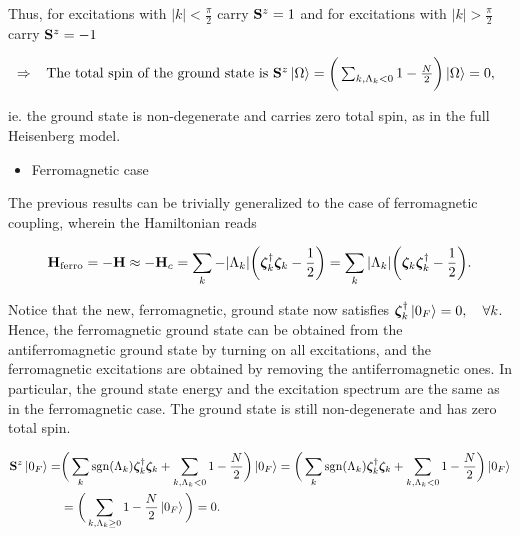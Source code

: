 \documentclass{homework}
\begin{document}
Thus, for excitations with $|k| < \frac{\pi}{2}$ carry ${\bf S}^z = 1$ and for excitations with $|k| > \frac{\pi}{2}$ carry ${\bf S}^z = -1$ 

\begin{equation}
    \begin{split}
        \Rightarrow \begin{array}{cc}
             \textnormal{ The total spin of the ground state is } {\bf S}^z \ket{\Omega} = \bigg(\sum_{k, \Lambda_k < 0} 1-\frac{N}{2}\bigg) \ket{\Omega} = 0,
        \end{array} 
    \end{split}
\end{equation}

ie. the ground state is non-degenerate and carries zero total spin, as in the full Heisenberg model. \\

\begin{itemize}
    \item Ferromagnetic case
\end{itemize}

The previous results can be trivially generalized to the case of ferromagnetic coupling, wherein the Hamiltonian reads 

\begin{equation}
    {\bf H}_{\textnormal{ferro}} = - {\bf H} \approx -{\bf H}_c = \sum_{k} -|\Lambda_k| \bigg( \bm{\zeta}_k^\dagger \bm{\zeta}_k - \frac{1}{2} \bigg) = \sum_{k} |\Lambda_k| \bigg( \bm{\zeta}_k\bm{\zeta}_k^\dagger - \frac{1}{2} \bigg).
\end{equation}

Notice that the new, ferromagnetic, ground state now satisfies $\bm{\zeta}_k^\dagger \ket{0_F} = 0, \quad \forall k$. Hence, the ferromagnetic ground state can be obtained from the antiferromagnetic ground state by turning on all excitations, and the ferromagnetic excitations are obtained by removing the antiferromagnetic ones. In particular, the ground state energy and the excitation spectrum are the same as in the ferromagnetic case. The ground state is still non-degenerate and has zero total spin. 

\begin{equation}
    \begin{split}
        {\bf S}^z \ket{0_F}=& \bigg( \sum_{k} \textnormal{sgn}(\Lambda_k) \bm{\zeta}_k^\dagger\bm{\zeta}_k + \sum_{k, \Lambda_k < 0} 1 - \frac{N}{2}\bigg) \ket{0_F} = \bigg( \sum_{k} \textnormal{sgn}(\Lambda_k) \bm{\zeta}_k^\dagger\bm{\zeta}_k + \sum_{k, \Lambda_k < 0} 1 - \frac{N}{2} \bigg)\ket{0_F} \\
        &= \bigg(\sum_{k, \Lambda_k \geq 0} 1 - \frac{N}{2}\ket{0_F} \bigg) = 0.
    \end{split}
\end{equation}
\end{document}

